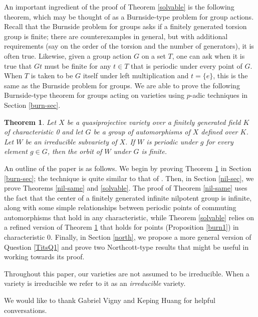 \documentclass{amsart}
\newtheorem{thm}{Theorem}[section]
\theoremstyle{definition}
\begin{document}
An important ingredient of the proof of Theorem \ref{solvable} is the
following theorem, which may be thought of as a Burnside-type problem
for group actions.  Recall that the Burnside problem for groups asks
if a finitely generated torsion group is finite; there are
counterexamples in general, but with additional requirements (say on
the order of the torsion and the number of generators), it is often
true.  Likewise, given a group action $G$ on a set $T$, one can ask when
it is true that $Gt$ must be finite for any $t \in T$ that is periodic
under every point of $G$.  When $T$ is taken to be $G$ itself under
left multiplication and $t = \{ e \}$, this is the same as the Burnside
problem for groups.  We are able to prove the following Burnside-type
theorem for groups acting on varieties using $p$-adic techniques in
Section \ref{burn-sec}.  

\begin{thm}\label{arith-burn}
  Let $X$ be a quasiprojective variety over a finitely generated field
  $K$ of characteristic 0 and let $G$ be a group of automorphisms of
  $X$ defined over $K$.  Let $W$ be an irreducible subvariety of $X$.
  If $W$ is periodic under $g$ for every element $g \in G$, then the
  orbit of $W$ under $G$ is finite.
\end{thm}

An outline of the paper is as follows. We begin by proving Theorem
\ref{arith-burn} in Section \ref{burn-sec}; the technique is quite
similar to that of \cite{BGT2}.  Then, in Section \ref{nil-sec}, we
prove Theorems \ref{nil-same} and \ref{solvable}.  The proof of
Theorem \ref{nil-same} uses the fact that the center of a
finitely generated infinite nilpotent group is infinite, along with some simple
relationships between periodic points of commuting automorphisms that
hold in any characteristic, while Theorem \ref{solvable} relies on a
refined version of Theorem \ref{arith-burn} that holds for points
(Proposition \ref{burn1}) in characteristic 0.  Finally, in Section
\ref{north}, we propose a more general version of Question
\ref{TitsQ1} and prove two Northcott-type results that might be useful
in working towards its proof.

Throughout this paper, our varieties are not assumed to be
irreducible.  When a variety is irreducible we refer to it as an {\em
  irreducible} variety.


  We would like to thank Gabriel Vigny and
Keping Huang for helpful conversations.  
\end{document}
